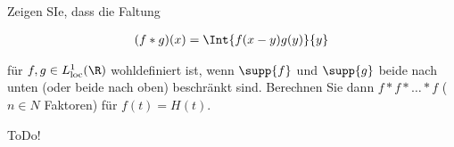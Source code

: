 
\begin{exercise}

Zeigen SIe, dass die Faltung

\begin{align*}
    (f \ast g)(x)
    =
    \Int{f(x - y) g(y)}{y}
\end{align*}

für $f, g \in L^1_{\text{loc}}(\R)$ wohldefiniert ist, wenn $\supp{f}$ und $\supp{g}$ beide nach unten (oder beide nach oben) beschränkt sind.
Berechnen Sie dann $f \ast f \ast \ldots \ast f$ ($n \in N$ Faktoren) für $f(t) = H(t)$.

\end{exercise}


\begin{solution}

ToDo!

\end{solution}

